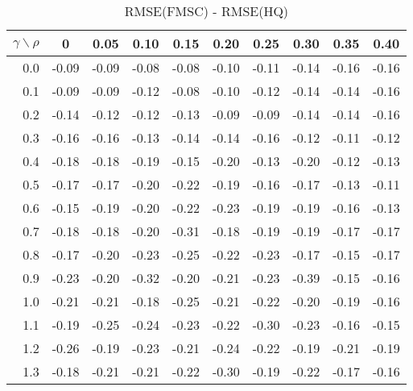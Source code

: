 \documentclass[12pt]{article}
\begin{document}
\begin{table}[!tbp]
\caption{RMSE(FMSC) - RMSE(HQ)}
 \begin{center}
 \begin{tabular}{r|rrrrrrrrr}\hline\hline
\multicolumn{1}{c|}{$\gamma\backslash\rho$}&\multicolumn{1}{c}{0}&\multicolumn{1}{c}{0.05}&\multicolumn{1}{c}{0.10}&\multicolumn{1}{c}{0.15}&\multicolumn{1}{c}{0.20}&\multicolumn{1}{c}{0.25}&\multicolumn{1}{c}{0.30}&\multicolumn{1}{c}{0.35}&\multicolumn{1}{c}{0.40}\tabularnewline
\hline

0.0&-0.09&-0.09&-0.08&-0.08&-0.10&-0.11&-0.14&-0.16&-0.16\tabularnewline
0.1&-0.09&-0.09&-0.12&-0.08&-0.10&-0.12&-0.14&-0.14&-0.16\tabularnewline
0.2&-0.14&-0.12&-0.12&-0.13&-0.09&-0.09&-0.14&-0.14&-0.16\tabularnewline
0.3&-0.16&-0.16&-0.13&-0.14&-0.14&-0.16&-0.12&-0.11&-0.12\tabularnewline
0.4&-0.18&-0.18&-0.19&-0.15&-0.20&-0.13&-0.20&-0.12&-0.13\tabularnewline
0.5&-0.17&-0.17&-0.20&-0.22&-0.19&-0.16&-0.17&-0.13&-0.11\tabularnewline
0.6&-0.15&-0.19&-0.20&-0.22&-0.23&-0.19&-0.19&-0.16&-0.13\tabularnewline
0.7&-0.18&-0.18&-0.20&-0.31&-0.18&-0.19&-0.19&-0.17&-0.17\tabularnewline
0.8&-0.17&-0.20&-0.23&-0.25&-0.22&-0.23&-0.17&-0.15&-0.17\tabularnewline
0.9&-0.23&-0.20&-0.32&-0.20&-0.21&-0.23&-0.39&-0.15&-0.16\tabularnewline
1.0&-0.21&-0.21&-0.18&-0.25&-0.21&-0.22&-0.20&-0.19&-0.16\tabularnewline
1.1&-0.19&-0.25&-0.24&-0.23&-0.22&-0.30&-0.23&-0.16&-0.15\tabularnewline
1.2&-0.26&-0.19&-0.23&-0.21&-0.24&-0.22&-0.19&-0.21&-0.19\tabularnewline
1.3&-0.18&-0.21&-0.21&-0.22&-0.30&-0.19&-0.22&-0.17&-0.16\tabularnewline
\hline
\end{tabular}

\end{center}

\end{table}

%
\end{document}
